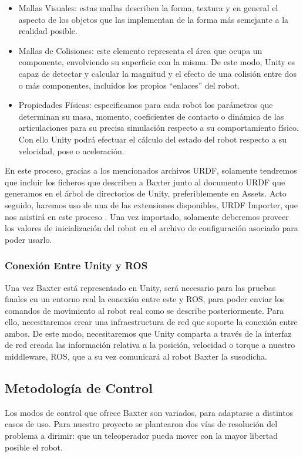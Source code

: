 \begin{itemize}
    \item Mallas Visuales: estas mallas describen la forma, textura y en general el aspecto de los objetos que las implementan de la forma más semejante a la realidad posible.
    
    \item Mallas de Colisiones: este elemento representa el área que ocupa un componente, envolviendo su superficie con la misma. De este modo, Unity es capaz de detectar y calcular la magnitud y el efecto de una colisión entre dos o más componentes, incluidos los propios “enlaces” del robot.
    
    \item Propiedades Físicas: especificamos para cada robot los parámetros que determinan su masa, momento, coeficientes de contacto o dinámica de las articulaciones para su precisa simulación respecto a su comportamiento físico. Con ello Unity podrá efectuar el cálculo del estado del robot respecto a su velocidad, pose o aceleración.
\end{itemize}

En este proceso, gracias a los mencionados archivos URDF, solamente tendremos que incluir los ficheros que describen a Baxter junto al documento URDF que generamos en el árbol de directorios de Unity, preferiblemente en Assets. Acto seguido, haremos uso de una de las extensiones disponibles, URDF Importer, que nos asistirá en este proceso \cite{68}. Una vez importado, solamente deberemos proveer los valores de inicialización del robot en el archivo de configuración asociado para poder usarlo.

\subsubsection{Conexión Entre Unity y ROS}
Una vez Baxter está representado en Unity, será necesario para las pruebas finales en un entorno real la conexión entre este y ROS, para poder enviar los comandos de movimiento al robot real como se describe posteriormente. Para ello, necesitaremos crear una infraestructura de red que soporte la conexión entre ambos. De este modo, necesitaremos que Unity comparta a través de la interfaz de red creada las información relativa  a la posición, velocidad o torque a nuestro middleware, ROS, que a su vez comunicará al robot Baxter la susodicha.


\subsection{Metodología de Control}
Los modos de control que ofrece Baxter son variados, para adaptarse a distintos casos de uso. Para nuestro proyecto se plantearon dos vías de resolución del problema a dirimir: que un teleoperador pueda mover con la mayor libertad posible el robot.


